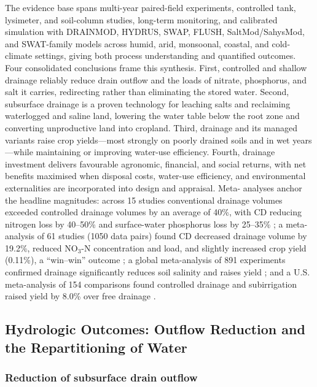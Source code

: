 \documentclass[11pt]{article}
\begin{document}
The evidence base spans multi-year paired-field experiments, controlled tank,
lysimeter, and soil-column studies, long-term monitoring, and calibrated
simulation with DRAINMOD, HYDRUS, SWAP, FLUSH, SaltMod/SahysMod, and
SWAT-family models across humid, arid, monsoonal, coastal, and cold-climate
settings, giving both process understanding and quantified outcomes. Four
consolidated conclusions frame this synthesis. First, controlled and shallow
drainage reliably reduce drain outflow and the loads of nitrate, phosphorus, and
salt it carries, redirecting rather than eliminating the stored water. Second,
subsurface drainage is a proven technology for leaching salts and reclaiming
waterlogged and saline land, lowering the water table below the root zone and
converting unproductive land into cropland. Third, drainage and its managed
variants raise crop yields---most strongly on poorly drained soils and in wet
years---while maintaining or improving water-use efficiency. Fourth, drainage
investment delivers favourable agronomic, financial, and social returns, with
net benefits maximised when disposal costs, water-use efficiency, and
environmental externalities are incorporated into design and appraisal. Meta-
analyses anchor the headline magnitudes: across 15 studies conventional drainage
volumes exceeded controlled drainage volumes by an average of 40\%, with CD
reducing nitrogen loss by 40--50\% and surface-water phosphorus loss by 25--35\%
\parencite{Strock2011}; a meta-analysis of 61 studies (1050 data pairs) found CD
decreased drainage volume by 19.2\%, reduced NO$_3$-N concentration and load,
and slightly increased crop yield (0.11\%), a ``win--win'' outcome
\parencite{Wang2020c}; a global meta-analysis of 891 experiments confirmed
drainage significantly reduces soil salinity and raises yield
\parencite{Yang2025}; and a U.S. meta-analysis of 154 comparisons found
controlled drainage and subirrigation raised yield by 8.0\% over free drainage
\parencite{Singh2022b}.

\subsection{Hydrologic Outcomes: Outflow Reduction and the Repartitioning of Water}

\subsubsection{Reduction of subsurface drain outflow}
\end{document}

